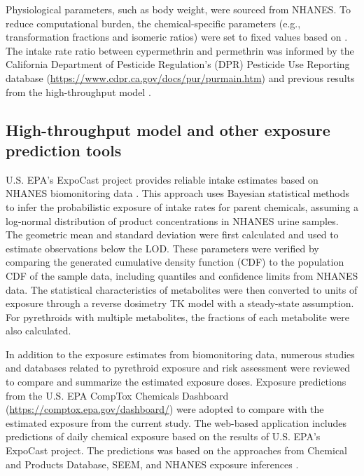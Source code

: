 \documentclass[toxics,article,submit,pdftex,moreauthors]{Definitions/mdpi}
\begin{document}
Physiological parameters, such as body weight, were sourced from NHANES.
To reduce computational burden, the chemical-specific parameters (e.g.,
transformation fractions and isomeric ratios) were set to fixed values
based on \citet{quindroit2019estimating}. The intake rate ratio between
cypermethrin and permethrin was informed by the California
Department of Pesticide Regulation's (DPR) Pesticide Use Reporting
database (\url{https://www.cdpr.ca.gov/docs/pur/purmain.htm}) and
previous results from the high-throughput model
\citep{stanfield2022bayesian}.

\subsection{High-throughput model and other exposure prediction
tools}\label{high-throughput-model-and-other-exposure-prediction-tools}

U.S. EPA's ExpoCast project provides reliable intake estimates based
on NHANES biomonitoring data \citep{wambaugh2013high}. This approach
uses Bayesian statistical methods to infer the probabilistic exposure of
intake rates for parent chemicals, assuming a log-normal distribution of
product concentrations in NHANES urine samples. The geometric mean and
standard deviation were first calculated and used to estimate
observations below the LOD. These parameters were verified by comparing
the generated cumulative density function (CDF) to the population CDF of
the sample data, including quantiles and confidence limits from NHANES
data. The statistical characteristics of metabolites were then converted
to units of exposure through a reverse dosimetry TK model with a
steady-state assumption. For pyrethroids with multiple metabolites, the
fractions of each metabolite were also calculated.

In addition to the exposure estimates from biomonitoring data, numerous
studies and databases related to pyrethroid exposure and risk assessment
were reviewed to compare and summarize the estimated exposure doses.
Exposure predictions from the U.S. EPA CompTox Chemicals Dashboard
(\url{https://comptox.epa.gov/dashboard/}) were adopted to compare with
the estimated exposure from the current study. The web-based application
includes predictions of daily chemical exposure based on the results of
U.S. EPA's ExpoCast project. The predictions was based on the approaches 
from Chemical and Products Database, SEEM, and NHANES exposure inferences
\citep{dionisio2018chemical, wambaugh2022exposure}.
\end{document}
